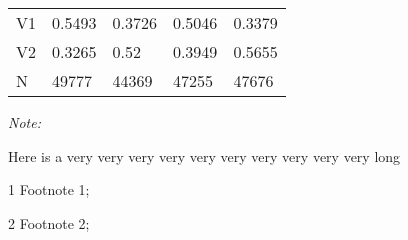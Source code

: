 \begin{table}
\begin{threeparttable}
\begin{tabular}[t]{lllll}
\hspace{1em}V1 & 0.5493 & 0.3726 & 0.5046 & 0.3379\\
\hspace{1em}V2 & 0.3265 & 0.52 & 0.3949 & 0.5655\\
N & 49777 & 44369 & 47255 & 47676\\
\bottomrule
\end{tabular}
\begin{tablenotes}
\item \textit{Note: } 
\item Here is a very very very very very very very very very very long
\item[1] Footnote 1; 
\item[2] Footnote 2; 
\end{tablenotes}
\end{threeparttable}
\end{table}
